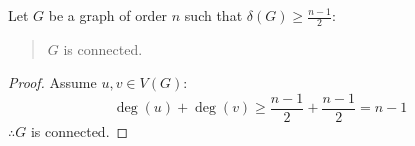 \documentclass[letterpaper,12pt,fleqn]{article}
\renewcommand{\d}{\delta}
\begin{document}
\begin{corollary}
  Let \(G\) be a graph of order \(n\) such that \(\d(G)\ge\frac{n-1}{2}\):
  \begin{quote}
    \(G\) is connected.
  \end{quote}
\end{corollary}

\begin{proof}
  Assume \(u,v\in V(G)\):
  \[\deg(u)+\deg(v)\ge\frac{n-1}{2}+\frac{n-1}{2}=n-1\]
  \(\therefore G\) is connected.
\end{proof}
\end{document}
